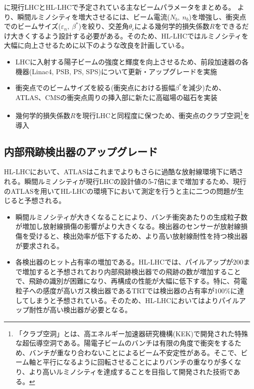 に現行LHCとHL-LHCで予定されている主なビームパラメータをまとめる。
より、瞬間ルミノシティを増大させるには、ビーム電流($N_b,\ n_b$)を増強し、衝突点でのビームサイズ($\varepsilon_n,\ \beta^*$)を絞り、交差角$\theta_c$による幾何学的損失係数$R$をできるだけ大きくするよう設計する必要がある。そのため、HL-LHCではルミノシティを大幅に向上させるために以下のような改良を計画している。
\begin{itemize}
  \item LHCに入射する陽子ビームの強度と輝度を向上させるため、前段加速器の各機器(Linac4, PSB, PS, SPS)について更新・アップグレードを実施
  \item 衝突点でのビームサイズを絞る(衝突点における振幅$\beta^*$を減少)ため、ATLAS、CMSの衝突点周りの挿入部に新たに高磁場の磁石を実装
  \item 幾何学的損失係数$R$を現行LHCと同程度に保つため、衝突点のクラブ空洞\footnote{「クラブ空洞」とは、高エネルギー加速器研究機構(KEK)で開発された特殊な超伝導空洞である。陽電子ビームのバンチは有限の角度で衝突をするため、バンチが重なり合わないことによるビーム不安定性がある。そこで、ビーム軸と平行になるように回転させることによりバンチの重なりが多くなり、より高いルミノシティを達成することを目指して開発された技術である。\cite{crab}}を導入
\end{itemize}


\subsection{内部飛跡検出器のアップグレード}
\label{sec:hl-lhc-itk}
HL-LHCにおいて、ATLASはこれまでよりもさらに過酷な放射線環境下に晒される。瞬間ルミノシティが現行LHCの設計値の$5 \mathchar`- 7$倍にまで増加するため、現行のATLASを用いてHL-LHCの環境下において測定を行うと主に二つの問題が生じると予想される。
\begin{itemize}
\item 瞬間ルミノシティが大きくなることにより、バンチ衝突あたりの生成粒子数が増加し放射線損傷の影響がより大きくなる。検出器のセンサーが放射線損傷を受けると、検出効率が低下するため、より高い放射線耐性を持つ検出器が要求される。
\item 各検出器のヒット占有率の増加である。HL-LHCでは、パイルアップが$200$まで増加すると予想されており内部飛跡検出器での飛跡の数が増加することで、飛跡の識別が困難になり、再構成の性能が大幅に低下する。特に、荷電粒子への感度が高いガス検出器であるTRTでは検出器の占有率が$100\si{\%}$に達してしまうと予想されている。そのため、HL-LHCにおいてはよりパイルアップ耐性が高い検出器が必要となる。
\end{itemize}

